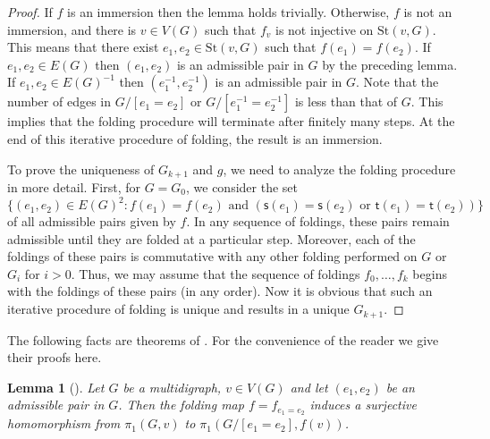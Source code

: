 \documentclass[10pt,a4paper]{amsart}
\newtheorem{lemma}[theorem]{Lemma}
\theoremstyle{definition}
\theoremstyle{definition}
\numberwithin{equation}{section}
\begin{document}
\begin{proof} If $f$ is an immersion then the lemma holds trivially. Otherwise, $f$ is not an immersion, and there is $v\in V(G)$ such that $f_v$ is not injective on $\mbox{St}(v, G)$. This means that there exist $e_1, e_2\in \mbox{St}(v, G)$ such that $f(e_1)=f(e_2)$. If $e_1, e_2\in E(G)$ then $(e_1, e_2)$ is an admissible pair in $G$ by the preceding lemma. If $e_1, e_2\in E(G)^{-1}$ then $(e_1^{-1}, e_2^{-1})$ is an admissible pair in $G$. Note that the number of edges in $G/[e_1=e_2]$ or $G/[e_1^{-1}= e_2^{-1}]$ is less than that of $G$. This implies that the folding procedure will terminate after finitely many steps. At the end of this iterative procedure of folding, the result is an immersion.

To prove the uniqueness of $G_{k+1}$ and $g$, we need to analyze the folding procedure in more detail. First, for $G=G_0$, we consider the set
$$ \{(e_1, e_2)\in E(G)^2\colon f(e_1)=f(e_2) \mbox{ and } (\mathsf{s}(e_1)=\mathsf{s}(e_2) \mbox{ or } \mathsf{t}(e_1)=\mathsf{t}(e_2)) \} $$
of all admissible pairs given by $f$. In any sequence of foldings, these pairs remain admissible until they are folded at a particular step. Moreover, each of the foldings of these pairs is commutative with any other folding performed on $G$ or $G_i$ for $i>0$. Thus, we may assume that the sequence of foldings $f_0, \dots, f_k$ begins with the foldings of these pairs (in any order). Now it is obvious that such an iterative procedure of folding is unique and results in a unique $G_{k+1}$.
\end{proof}

The following facts are theorems of \cite{St83}. For the convenience of the reader we give their proofs here.

\begin{lemma}[{\cite[Corollary 4.4]{St83}}] \label{lem:surj} Let $G$ be a multidigraph, $v\in V(G)$ and let $(e_1,e_2)$ be an admissible pair in $G$. Then the folding map $f=f_{e_1=e_2}$ induces a surjective homomorphism from $\pi_1(G, v)$ to $\pi_1(G/[e_1=e_2], f(v))$. 
\end{lemma}
\end{document}
